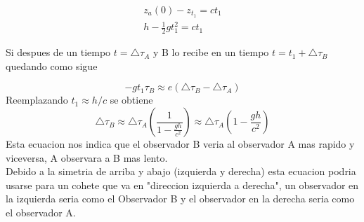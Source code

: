 \documentclass[12pt,twoside]{rif}
\begin{document}
\begin{eqnarray}
z_{a}(0)-z_{t_{1}}=ct_{1} \\
h-\frac{1}{2}gt_{1}^{2}=ct_{1}
\end{eqnarray}

Si despues de un tiempo $t=\triangle\tau_{A} $ y B lo recibe en un tiempo 
$ t=t_{1}+\triangle\tau_{B} $ quedando como sigue%



\begin{equation}
-gt_{1}\tau_{B}\approx e(\triangle\tau_{B}-\triangle\tau_{A})
\end{equation}
Reemplazando $t_{1}\approx h/c$ se obtiene
\begin{equation}
\triangle\tau_{B}\approx\triangle\tau_{A}\left(\frac{1}{1-\frac{gh}{c^{2}}}\right)\approx\triangle\tau_{A}\left(1-\frac{gh}{c^{2}}\right)
\end{equation}
Esta ecuacion nos indica que el observador B veria al observador A mas rapido y viceversa, A observara a B mas lento.\\
Debido a la simetria de arriba y abajo (izquierda y derecha) esta ecuacion podria usarse para un cohete que va en "direccion izquierda a derecha", un observador en la izquierda seria como el Observador B y el observador en la derecha seria como el observador A.
\end{document}
